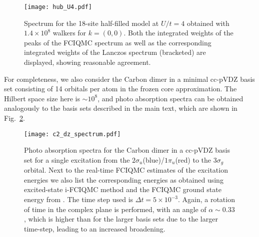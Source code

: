 \begin{figure}[t!]
\texttt{[image: hub\_U4.pdf]}
\caption{Spectrum for the 18-site half-filled model at $U/t=4$ obtained
with $1.4\times 10^8$ walkers for $k=(0,0)$. Both the integrated weights of
the peaks of the FCIQMC spectrum as well as the corresponding integrated
weights of the Lanczos spectrum (bracketed) are displayed, showing reasonable agreement.}
\label{fig:HubU4}
\end{figure}

For completeness, we also consider the Carbon dimer in a minimal cc-pVDZ basis
set consisting of 14 orbitals per atom in the frozen core approximation. The
Hilbert space size here is $\sim 10^8$, and photo absorption spectra can be
obtained analogously to the basis sets described in the main text, which are
shown in Fig.~\ref{fig:C2DZ}.

\begin{figure}[t!]
\texttt{[image: c2\_dz\_spectrum.pdf]}
\caption{Photo absorption spectra for the Carbon dimer in a cc-pVDZ basis set
  for a single excitation from the $2\sigma_u$(blue)/$1\pi_u$(red) to the
  $3\sigma_g$ orbital. Next to the real-time FCIQMC estimates of the
  excitation energies we also list the corresponding energies as obtained
  using excited-state i-FCIQMC method \cite{excited_state_neci} and the FCIQMC ground
state energy from \cite{BTCA2012}. The time step used is $\Delta t = 5 \times
10^{-3}$. Again, a rotation of time in the complex plane is performed, with an
angle of $\alpha \sim 0.33$, which is higher than for the larger basis sets
due to the larger time-step, leading to an increased broadening.}
\label{fig:C2DZ}
\end{figure}

%
